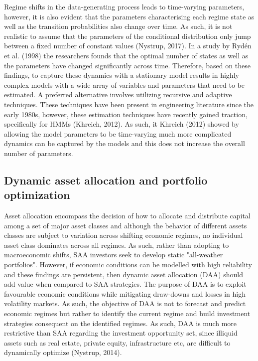 Regime shifts in the data-generating process leads to time-varying parameters, however, it is also evident that the parameters characterising each regime state as well as the transition probabilities also change over time. As such, it is not realistic to assume that the parameters of the conditional distribution only jump between a fixed number of constant values (Nystrup, 2017). In a study by Rydén et al. (1998) the researchers founds that the optimal number of states as well as the parameters have changed significantly across time. Therefore, based on these findings, to capture these dynamics with a stationary model results in highly complex models with a wide array of variables and parameters that need to be estimated. A preferred alternative involves utilizing recursive and adaptive techniques. These techniques have been present in engineering literature since the early 1980s, however, these estimation techniques have recently gained traction, specifically for HMMs (Khreich, 2012). As such, it Khreich (2012) showed by allowing the model parameters to be time-varying much more complicated dynamics can be captured by the models and this does not increase the overall number of parameters.

\subsection{Dynamic asset allocation and portfolio optimization}
Asset allocation encompass the decision of how to allocate and distribute capital among a set of major asset classes and although the behavior of different assets classes are subject to variation across shifting economic regimes, no individual asset class dominates across all regimes. As such, rather than adopting to macroeconomic shifts, SAA investors seek to develop static "all-weather portfolios". However, if economic conditions can be modelled with high reliability and these findings are persistent, then dynamic asset allocation (DAA) should add value when compared to SAA strategies. The purpose of DAA is to exploit favourable economic conditions while mitigating draw-downs and losses in high volatility markets. As such, the objective of DAA is not to forecast and predict economic regimes but rather to identify the current regime and build investment strategies consequent on the identified regimes. As such, DAA is much more restrictive than SAA regarding the investment opportunity set, since illiquid assets such as real estate, private equity, infrastructure etc, are difficult to dynamically optimize (Nystrup, 2014).

